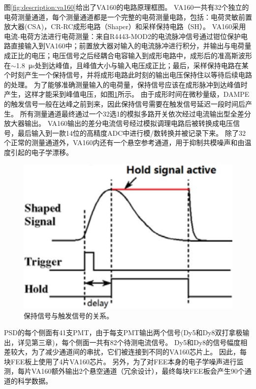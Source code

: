 图\ref{fig:description:va160}给出了VA160的电路原理框图。
VA160一共有32个独立的电荷测量通道，每个测量通道都是一个完整的电荷测量电路，包括：电荷灵敏前置放大器(CSA)，CR-RC成形电路（Shaper）和采样保持电路（SH）。
VA160采用电流-电荷方法进行电荷测量：来自R4443-MOD2的电流脉冲信号通过钳位保护电路直接输入到VA160中；前置放大器对输入的电流脉冲进行积分，并输出与电荷量成正比的电压；电压信号之后经耦合电容输入到成形电路中，成形后的准高斯波形在$\sim$\SI{1.8}{\micro\second}处到达峰值，且峰值大小与输入电压成正比；最后，采样保持电路在某个时刻产生一个保持信号，并将成形电路此时刻的输出电压保持住以等待后续电路的处理。
为了能够准确测量输入的电荷量，保持信号应该在成形脉冲到达峰值时产生，这样才能采到峰值电压，如图\ref{fig:description:sample_hold}所示。
由于成形时间在微秒量级，DAMPE的触发信号一般在达峰之前到来，因此保持信号需要在触发信号延迟一段时间后产生。
所有测量通道最终通过一个32选1的模拟多路开关依次经过电流输出型全差分放大器输出。
VA160输出的差分电流信号经过模拟调理电路后被转换成电压信号，最后输入到一款14位的高精度ADC中进行模/数转换并被记录下来。
除了32个正常的测量通道外，VA160内还有一个悬空参考通道，用于抑制共模噪声和由温度引起的电子学漂移。

\begin{figure}[h!]	
	\centering
	\includegraphics[width=0.5\linewidth]{chap/description/fig/sample_hold}
	\caption{保持信号与触发信号的关系。}
	\label{fig:description:sample_hold}
\end{figure}

PSD的每个侧面有41支PMT，由于每支PMT输出两个信号(Dy5和Dy8双打拿极输出，详见第三章)，每个侧面一共有82个待测电流信号。
Dy5和Dy8的信号幅度相差较大，为了减少通道间的串扰，它们被连接到不同的VA160芯片上。
因此，每块FEE板上使用了4片VA160芯片。
另外，为了对FEE本身的电子学噪声进行监测，每片VA160额外输出2个悬空通道（冗余设计），最终每块FEE板会产生90个通道的科学数据。

